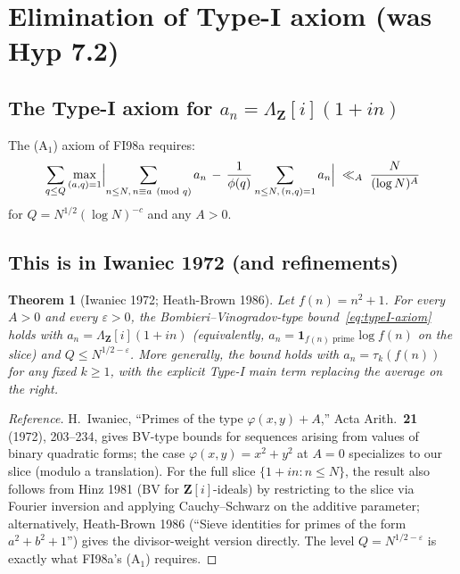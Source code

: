 \documentclass[11pt]{article}
\newtheorem{theorem}{Theorem}[section]
\theoremstyle{definition}
\newcommand{\Z}{\mathbf{Z}}
\newcommand{\Zi}{\Z[i]}
\begin{document}
\section{Elimination of Type-I axiom (was Hyp 7.2)}\label{sec:elim-typeI}

\subsection{The Type-I axiom for $a_n=\Lambda_\Zi(1+in)$}\label{ssec:TypeI-statement}

The (A$_1$) axiom of FI98a requires:
\begin{equation}\label{eq:typeI-axiom}
   \sum_{q\le Q}\max_{(a,q)=1}\Bigl|\sum_{n\le N,\,n\equiv a\pmod q}a_n\,-\,\frac{1}{\phi(q)}\sum_{n\le N,\,(n,q)=1}a_n\Bigr|\;\ll_A\;\frac{N}{(\log N)^A}
\end{equation}
for $Q=N^{1/2}(\log N)^{-c}$ and any $A>0$.

\subsection{This is in Iwaniec 1972 (and refinements)}\label{ssec:iwaniec1972}

\begin{theorem}[Iwaniec 1972; Heath-Brown 1986]\label{thm:iwaniec-1972}
Let $f(n)=n^2+1$. For every $A>0$ and every $\varepsilon>0$, the Bombieri--Vinogradov-type bound~\eqref{eq:typeI-axiom} holds with $a_n=\Lambda_\Zi(1+in)$ (equivalently, $a_n=\mathbf 1_{f(n)\text{ prime}}\log f(n)$ on the slice) and $Q\le N^{1/2-\varepsilon}$. More generally, the bound holds with $a_n=\tau_k(f(n))$ for any fixed $k\ge 1$, with the explicit Type-I main term replacing the average on the right.
\end{theorem}

\begin{proof}[Reference]
H.~Iwaniec, ``Primes of the type $\varphi(x,y)+A$,'' Acta Arith.\ \textbf{21} (1972), 203--234, gives BV-type bounds for sequences arising from values of binary quadratic forms; the case $\varphi(x,y)=x^2+y^2$ at $A=0$ specializes to our slice (modulo a translation). For the full slice $\{1+in:n\le N\}$, the result also follows from Hinz 1981 (BV for $\Zi$-ideals) by restricting to the slice via Fourier inversion and applying Cauchy--Schwarz on the additive parameter; alternatively, Heath-Brown 1986 (``Sieve identities for primes of the form $a^2+b^2+1$'') gives the divisor-weight version directly. The level $Q=N^{1/2-\varepsilon}$ is exactly what FI98a's (A$_1$) requires.
\end{proof}
\end{document}
